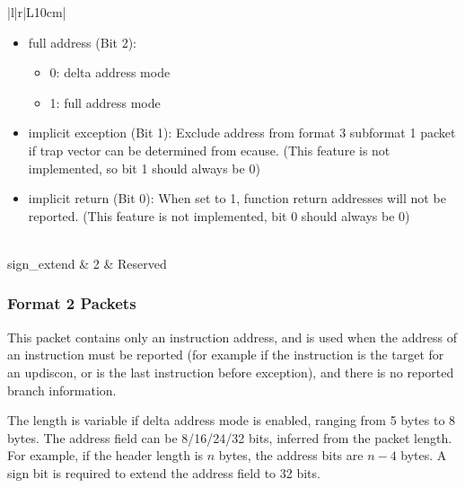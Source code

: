 \documentclass[main\_\_EN.tex]{subfiles}
\begin{document}
\begin{longtable}[c]{ |l|r|L{10cm}| }
\begin{itemize}
        \item full address (Bit 2):
            \begin{itemize}
                \item 0: delta address mode
                \item 1: full address mode
            \end{itemize}
        \item implicit exception (Bit 1): Exclude address from format 3 subformat 1 packet if trap vector can be determined from ecause. (This feature is not implemented, so bit 1 should always be 0)
        \item implicit return (Bit 0): When set to 1, function return addresses will not be reported. (This feature is not implemented, bit 0 should always be 0)
    \end{itemize}
    \\\hline
    sign\_extend & 2 & Reserved \\\hline

 \end{longtable}



\subsubsection{Format 2 Packets}

This packet contains only an instruction address, and is used when the address of an instruction must be reported (for example if the instruction is the target for an updiscon, or is the last instruction before exception), and there is no reported branch information.


The length is variable if delta address mode is enabled, ranging from 5 bytes to 8 bytes. The address field can be 8/16/24/32 bits, inferred from the packet length. For example, if the header length is $n$ bytes, the address bits are $n-4$ bytes. A sign bit is required to extend the address field to 32 bits.
\end{document}

